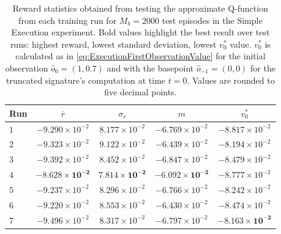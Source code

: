 \documentclass[
    a4paper,
    11pt,
    bibliography=totoc,
    listof=totoc,      
    headinclude=true,
    cleardoublepage=empty,
]{scrbook}
\theoremstyle{plain}
\theoremstyle{definition}
\theoremstyle{remark}
\begin{document}
\begin{table}[htpb!]
    \centering
    \caption[%
        Test statistics for rewards in the Simple Execution experiment.
    ]{%
        Reward statistics obtained from testing the approximate Q-function from 
        each training run for $M_b=2000$ test episodes in the Simple Execution 
        experiment. Bold values highlight the best result over test runs: 
        highest reward, lowest standard deviation, lowest $v_0^*$ value. 
        $v^*_0$ is calculated as in \cref{eq:ExecutionFirstObservationValue} 
        for the initial observation $\hat{o}_0 = (1, 0.7)$ and with the 
        basepoint $\hat{o}_{-1} = (0, 0)$ for the truncated signature's 
        computation at time $t=0$. Values are rounded to five decimal points. 
    }
    \label{tab:ExecutionTestResultsRewardsStatistics}        
    \begin{tabularx}{\textwidth}{ >{\centering}m{1.5cm} *{4}{C} }
        \toprule
        Run & ${\overline r}$ & ${\sigma_r}$ & 
            ${m}$ & ${v^*_0}$ \\
        \midrule
        \midrule

        $ 1$ & $-9.290\times10^{-2}$ & $8.177\times10^{-2}$ 
            & $-6.769\times10^{-2}$ & $-8.817\times10^{-2}$ \\
            
        $ 2$ & $-9.323\times10^{-2}$ & $9.122\times10^{-2}$ 
            & $-6.439\times10^{-2}$ & $-8.194\times10^{-2}$ \\

        $ 3$ & $-9.392\times10^{-2}$ & $8.452\times10^{-2}$ 
            & $-6.847\times10^{-2}$ & $-8.479\times10^{-2}$ \\

        $ 4$ & $\bm{-8.628\times10^{-2}}$ & $\bm{7.814\times10^{-2}}$ 
            & $\bm{-6.092\times10^{-2}}$ & $-8.777\times10^{-2}$ \\

        $ 5$ & $-9.237\times10^{-2}$ & $8.296\times10^{-2}$ 
            & $-6.766\times10^{-2}$ & $-8.242\times10^{-2}$ \\

        $ 6$ & $-9.220\times10^{-2}$ & $8.553\times10^{-2}$ 
            & $-6.430\times10^{-2}$ & $-8.474\times10^{-2}$ \\

        $ 7$ & $-9.496\times10^{-2}$ & $8.317\times10^{-2}$ 
        & $-6.797\times10^{-2}$ & $\bm{-8.163\times10^{-2}}$ \\


\end{tabularx}
\end{table}
\end{document}
